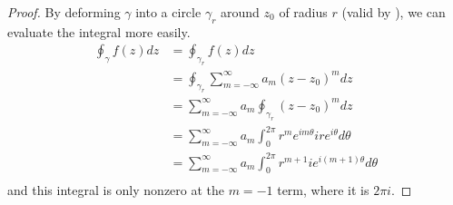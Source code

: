 \documentclass[../Main.tex]{subfiles}
\begin{document}
\begin{proof}
    By deforming $\gamma$ into a circle $\gamma_r$ around $z_0$ of radius $r$ (valid by ), we can evaluate the integral more easily.
    \begin{align*}
        \oint_\gamma f(z) dz &= \oint_{\gamma_r} f(z) dz \\
        &= \oint_{\gamma_r} \sum_{m=-\infty}^{\infty} a_m (z - z_0)^m dz \\
        &= \sum_{m = -\infty}^{\infty} a_m \oint_{\gamma_r} (z - z_0)^m dz \\
        &= \sum_{m = -\infty}^{\infty} a_m \int_0^{2\pi} r^m e^{im\theta} i r e^{i\theta} d\theta \\
        &= \sum_{m = -\infty}^{\infty} a_m \int_0^{2\pi} r^{m+1} ie^{i(m+1)\theta} d\theta \\
    \end{align*}
    and this integral is only nonzero at the $m = -1$ term, where it is $2\pi i$.
\end{proof}
\end{document}
